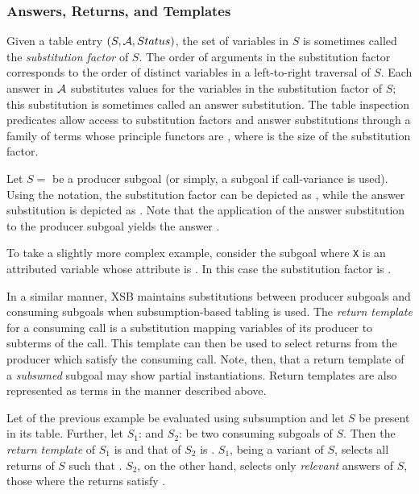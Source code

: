 
\subsubsection*{Answers, Returns, and Templates}

%
Given a table entry $(S,{\cal A},Status)$, the set of variables in $S$ is
sometimes called the {\em substitution factor} of $S$.  The order of
arguments in the substitution factor corresponds to the order of
distinct variables in a left-to-right traversal of $S$.  Each answer
in ${\cal A}$ substitutes values for the variables in the substitution
factor of $S$; this substitution is sometimes called an answer
substitution.  The table inspection predicates allow access to
substitution factors and answer substitutions through a family of terms
whose principle functors are \retn, where  is the size of the
substitution factor.

\begin{example}
Let $S =$  be a producer subgoal (or simply, a subgoal
if call-variance is used).  Using the \retn notation, the substitution
factor can be depicted as , while the answer
substitution  is depicted as .  Note
that the application of the answer substitution to the producer
subgoal yields the answer .

To take a slightly more complex example, consider the subgoal
 where {\tt X} is an attributed variable whose attribute is
.  In this case the substitution factor is
.\fillBox
\end{example}

In a similar manner, XSB maintains substitutions between producer
subgoals and consuming subgoals when subsumption-based tabling is
used.  The \emph{return template} for a consuming call is a
substitution mapping variables of its producer to subterms of the
call.  This template can then be used to select returns from the
producer which satisfy the consuming call.  Note, then, that a return
template of a \emph{subsumed} subgoal may show partial instantiations.
Return templates are also represented as \retn{} terms in the manner
described above.

\begin{example}
Let  of the previous example be evaluated using subsumption
and let $S$ be present in its table.  Further, let $S_1$:
 and $S_2$:  be two consuming
subgoals of $S$\@.  Then the \emph{return template} of $S_1$ is
 and that of $S_2$ is .  $S_1$, being
a variant of $S$, selects all returns of $S$ such that
\@.  $S_2$, on the other hand, selects only
\emph{relevant} answers of $S$, those where the returns satisfy
.\fillBox
\end{example}

